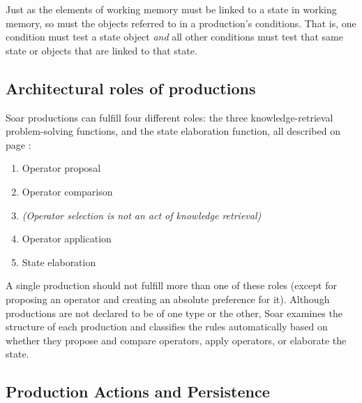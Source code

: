 Just as the elements of working memory must be linked to a state 
in working memory, so must the objects referred to in a production's
conditions. That is, one condition must test a state object 
\emph{and} all other conditions must test that same state or objects that
are linked to that state.

\subsection{Architectural roles of productions}
\label{ARCH-pm-roles}

Soar productions can fulfill four different roles: the three
knowledge-retrieval problem-solving functions, and the state elaboration function, all described on page \pageref{LIST:5functions}:\vspace{-10pt}
\begin{enumerate}
\item Operator proposal\vspace{-10pt}
\item Operator comparison\vspace{-10pt}
\item \textit{(Operator selection is not an act of knowledge 
retrieval)}\vspace{-10pt}
\item Operator application\vspace{-10pt}
\item State elaboration
\end{enumerate}

A single production should not fulfill more than one of these roles
(except for proposing an operator and creating an absolute preference
for it).  Although productions are not declared to be of one type or the
other, Soar examines the structure of each production and classifies the
rules automatically based on whether they propose and compare operators,
apply operators, or elaborate the state. 

\subsection{Production Actions and Persistence}
\label{ARCH-prefmem-persistence}
\label{PAGE:O-support}

